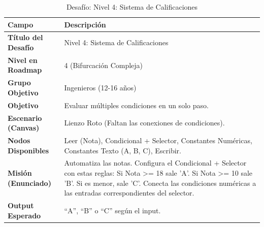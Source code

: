 \begin{table}[H]
    \centering
    \caption{Desafío: Nivel 4: Sistema de Calificaciones}
    \label{tab:desafio-ing-4}
    \begingroup
    \renewcommand{\arraystretch}{\TableRowStretch}
    \begin{tabularx}{\textwidth}{ l X }
        \hline
        \textbf{Campo}              & \textbf{Descripción}                                                                                                                                                                                                               \\
        \hline
        \textbf{Título del Desafío} & Nivel 4: Sistema de Calificaciones                                                                                                                                                                                                 \\
        \textbf{Nivel en Roadmap}   & 4 (Bifurcación Compleja)                                                                                                                                                                                                           \\
        \textbf{Grupo Objetivo}     & Ingenieros (12-16 años)                                                                                                                                                                                                            \\
        \textbf{Objetivo}           & Evaluar múltiples condiciones en un solo paso.                                                                                                                                                                                     \\
        \textbf{Escenario (Canvas)} & Lienzo Roto (Faltan las conexiones de condiciones).                                                                                                                                                                                \\
        \textbf{Nodos Disponibles}  & Leer (Nota), Condicional + Selector, Constantes Numéricas, Constantes Texto (A, B, C), Escribir.                                                                                                                                   \\
        \textbf{Misión (Enunciado)} & Automatiza las notas. Configura el Condicional + Selector con estas reglas: Si Nota >= 18 sale 'A'. Si Nota >= 10 sale 'B'. Si es menor, sale 'C'. Conecta las condiciones numéricas a las entradas correspondientes del selector. \\
        \textbf{Output Esperado}    & “A”, “B” o “C” según el input.                                                                                                                                                                                                     \\
        \hline
    \end{tabularx}
    \endgroup
\end{table}


